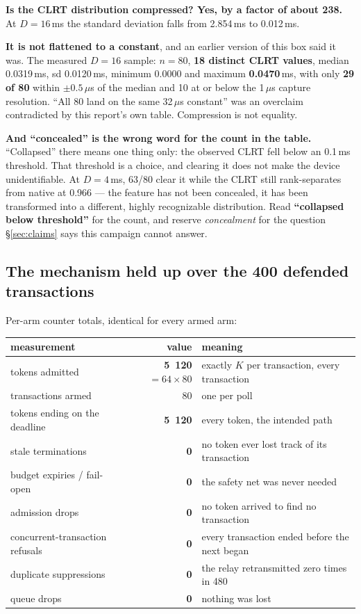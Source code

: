 \documentclass[10pt,a4paper,oneside]{article}
\newenvironment{keybox}{\begin{snugshade}\noindent\ignorespaces}{\end{snugshade}}
\newcommand{\num}[1]{\mbox{#1}}
\begin{document}
\begin{keybox}
\textbf{Is the CLRT distribution compressed? Yes, by a factor of about 238.} At $D=16$\,ms
the standard deviation falls from \num{2.854}\,ms to \num{0.012}\,ms.

\smallskip
\textbf{\textcolor{warnc}{It is not flattened to a constant}}, and an earlier
version of this box said it was. The measured $D=16$ sample: $n=80$, \textbf{18 distinct
CLRT values}, median \num{0.0319}\,ms, sd \num{0.0120}\,ms, minimum \num{0.0000} and maximum
\textbf{\num{0.0470}}\,ms, with only \textbf{29 of 80} within $\pm 0.5\,\mu$s of the median
and 10 at or below the 1\,$\mu$s capture resolution. ``All 80 land on the same 32\,$\mu$s
constant'' was an overclaim contradicted by this report's own table. Compression is not
equality.
\end{keybox}

\textbf{And ``concealed'' is the wrong word for the count in the table.}
``Collapsed'' there means one thing only: the observed CLRT fell below an 0.1\,ms threshold.
That threshold is a choice, and clearing it does not make the device unidentifiable. At
$D=4$\,ms, 63/80 clear it while the CLRT still rank-separates from native at \num{0.966} ---
the feature has not been concealed, it has been transformed into a different, highly
recognizable distribution. Read \textbf{``collapsed below threshold''} for the count, and
reserve \emph{concealment} for the question \S\ref{sec:claims} says this campaign cannot
answer.

\subsection{The mechanism held up over the 400 defended transactions}

Per-arm counter totals, identical for every armed arm:

\begin{center}
\begin{tabular}{lrl}
\toprule
\textbf{measurement} & \textbf{value} & \textbf{meaning} \\
\midrule
tokens admitted & \textbf{\num{5 120} $=64\times80$} & exactly $K$ per transaction, every transaction \\
transactions armed & 80 & one per poll \\
tokens ending on the deadline & \textbf{\num{5 120}} & every token, the intended path \\
stale terminations & \textbf{0} & no token ever lost track of its transaction \\
budget expiries / fail-open & \textbf{0} & the safety net was never needed \\
admission drops & \textbf{0} & no token arrived to find no transaction \\
concurrent-transaction refusals & \textbf{0} & every transaction ended before the next began \\
duplicate suppressions & \textbf{0} & the relay retransmitted zero times in 480 \\
queue drops & \textbf{0} & nothing was lost \\
\bottomrule
\end{tabular}
\end{center}
\end{document}
